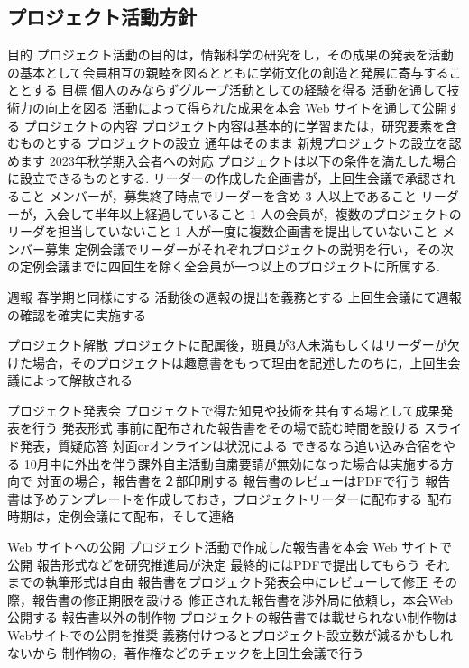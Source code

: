 \subsection*{プロジェクト活動方針}


目的
    プロジェクト活動の目的は，情報科学の研究をし，その成果の発表を活動の基本として会員相互の親睦を図るとともに学術文化の創造と発展に寄与することとする
目標
    個人のみならずグループ活動としての経験を得る
    活動を通して技術力の向上を図る
    活動によって得られた成果を本会 Web サイトを通して公開する
プロジェクトの内容
    プロジェクト内容は基本的に学習または，研究要素を含むものとする
プロジェクトの設立
    通年はそのまま
    新規プロジェクトの設立を認めます
    2023年秋学期入会者への対応
    プロジェクトは以下の条件を満たした場合に設立できるものとする.
    リーダーの作成した企画書が，上回生会議で承認されること
    メンバーが，募集終了時点でリーダーを含め 3 人以上であること
    リーダーが，入会して半年以上経過していること
    1 人の会員が，複数のプロジェクトのリーダを担当していないこと
    1 人が一度に複数企画書を提出していないこと
メンバー募集
    定例会議でリーダーがそれぞれプロジェクトの説明を行い，その次の定例会議までに四回生を除く全会員が一つ以上のプロジェクトに所属する.

週報
    春学期と同様にする
    活動後の週報の提出を義務とする
    上回生会議にて週報の確認を確実に実施する
    
    
プロジェクト解散
    プロジェクトに配属後，班員が3人未満もしくはリーダーが欠けた場合，そのプロジェクトは趣意書をもって理由を記述したのちに，上回生会議によって解散される
    
プロジェクト発表会
    プロジェクトで得た知見や技術を共有する場として成果発表を行う
    発表形式
    事前に配布された報告書をその場で読む時間を設ける
    スライド発表，質疑応答
    対面orオンラインは状況による
    できるなら追い込み合宿をやる
    10月中に外出を伴う課外自主活動自粛要請が無効になった場合は実施する方向で
    対面の場合，報告書を２部印刷する
    報告書のレビューはPDFで行う
    報告書は予めテンプレートを作成しておき，プロジェクトリーダーに配布する
    配布時期は，定例会議にて配布，そして連絡
        
Web サイトへの公開
    プロジェクト活動で作成した報告書を本会 Web サイトで公開
    報告形式などを研究推進局が決定
    最終的にはPDFで提出してもらう
    それまでの執筆形式は自由
    報告書をプロジェクト発表会中にレビューして修正
    その際，報告書の修正期限を設ける
    修正された報告書を渉外局に依頼し，本会Web公開する
    報告書以外の制作物
    プロジェクトの報告書では載せられない制作物はWebサイトでの公開を推奨
    義務付けつるとプロジェクト設立数が減るかもしれないから
    制作物の，著作権などのチェックを上回生会議で行う
        
